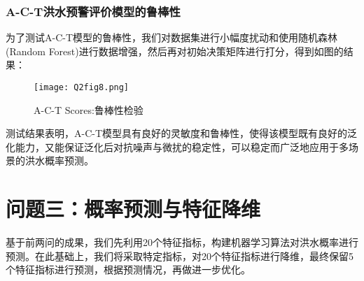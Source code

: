 \documentclass[withoutpreface,bwprint]{cumcmthesis} %
\begin{document}
\subsubsection{A-C-T洪水预警评价模型的鲁棒性}
为了测试A-C-T模型的鲁棒性，我们对数据集进行小幅度扰动和使用随机森林(Random Forest)进行数据增强，然后再对初始决策矩阵进行打分，得到如图的结果：
\begin{figure}[htbp]
	\centering
	\texttt{[image: Q2fig8.png]}
	\caption{A-C-T Scores:鲁棒性检验}
	\label{Q2fig8.png}
\end{figure}
测试结果表明，A-C-T模型具有良好的灵敏度和鲁棒性，使得该模型既有良好的泛化能力，又能保证泛化后对抗噪声与微扰的稳定性，可以稳定而广泛地应用于多场景的洪水概率预测。

\newpage
\section{问题三：概率预测与特征降维}
基于前两问的成果，我们先利用20个特征指标，构建机器学习算法对洪水概率进行预测。在此基础上，我们将采取特定指标，对20个特征指标进行降维，最终保留5个特征指标进行预测，根据预测情况，再做进一步优化。
\end{document}
